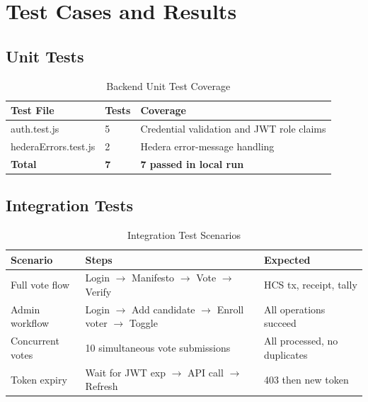 \chapter{Test Cases and Results}
\label{app:tests}

\section{Unit Tests}
\label{sec:unit-tests}

\begin{table}[H]
\centering
\caption{Backend Unit Test Coverage}
\label{tab:unit-tests}
\begin{tabular}{@{}lll@{}}
\toprule
\textbf{Test File} & \textbf{Tests} & \textbf{Coverage} \\
\midrule
auth.test.js & 5 & Credential validation and JWT role claims \\
hederaErrors.test.js & 2 & Hedera error-message handling \\
\midrule
\textbf{Total} & \textbf{7} & \textbf{7 passed in local run} \\
\bottomrule
\end{tabular}
\end{table}

\section{Integration Tests}
\label{sec:integration-tests}

\begin{table}[H]
\centering
\caption{Integration Test Scenarios}
\label{tab:integration-tests}
\begin{tabular}{@{}lll@{}}
\toprule
\textbf{Scenario} & \textbf{Steps} & \textbf{Expected} \\
\midrule
Full vote flow & Login $\rightarrow$ Manifesto $\rightarrow$ Vote $\rightarrow$ Verify & HCS tx, receipt, tally \\
Admin workflow & Login $\rightarrow$ Add candidate $\rightarrow$ Enroll voter $\rightarrow$ Toggle & All operations succeed \\
Concurrent votes & 10 simultaneous vote submissions & All processed, no duplicates \\
Token expiry & Wait for JWT exp $\rightarrow$ API call $\rightarrow$ Refresh & 403 then new token \\
\midrule
\end{tabular}
\end{table}

